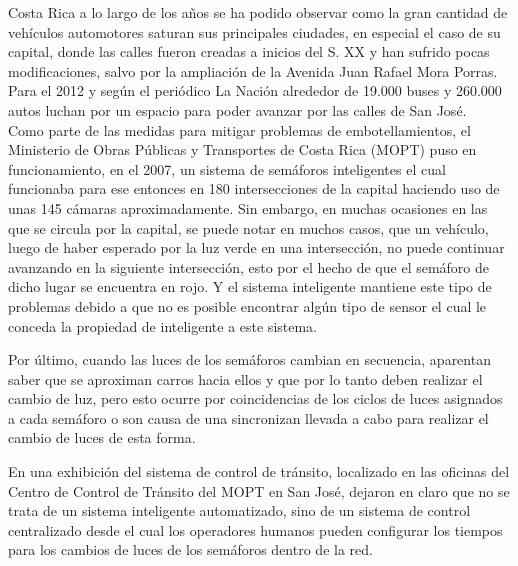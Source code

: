 \documentclass[12pt,journal,compsoc]{IEEEtran}
\begin{document}
% 
% 
% 
% 
 Costa Rica a lo largo de los a\~{n}os se ha podido observar como la gran
	cantidad de veh\'{i}culos automotores saturan sus principales ciudades, en especial
	el caso de su capital, donde las calles fueron creadas a inicios del S. XX y han sufrido pocas modificaciones, salvo por la ampliación de la Avenida Juan Rafael Mora Porras. Para el 2012 y seg\'{u}n el peri\'{o}dico La Naci\'{o}n
	alrededor de 19.000 buses y 260.000 autos luchan por un espacio para poder avanzar por las calles de San Jos\'{e}. \cite{Villegas2012}\\ 
	
Como parte de las medidas para mitigar problemas de embotellamientos, el
	Ministerio de Obras P\'{u}blicas y Transportes de Costa Rica (MOPT) puso en funcionamiento,
	en el 2007, un sistema de sem\'{a}foros inteligentes el cual funcionaba para
	ese entonces en 180 intersecciones de la capital haciendo uso de unas 145
	c\'{a}maras aproximadamente. Sin embargo, en muchas ocasiones en las que se
	circula por la capital, se puede notar en muchos
	casos, que un veh\'{i}culo, luego de haber esperado por la luz verde en una intersección,  no puede continuar  avanzando en la siguiente intersección, esto por el hecho
	de que el sem\'{a}foro de dicho lugar se encuentra en rojo. Y el sistema inteligente mantiene este tipo de
	problemas debido a que no es
	posible encontrar alg\'{u}n tipo de sensor el cual le conceda la propiedad de inteligente a este sistema.\cite{Loaiza2007}
		
		Por \'{u}ltimo, cuando las luces de los sem\'{a}foros cambian en secuencia, aparentan
	saber que se aproximan carros hacia ellos y que por lo tanto deben realizar el
	cambio de luz, pero esto ocurre por coincidencias de los ciclos de luces
	asignados a cada sem\'{a}foro o son causa de una sincronizan llevada a cabo para realizar el cambio de luces de esta forma.

		En una exhibici\'{o}n del sistema de control de tr\'{a}nsito, localizado en las
	oficinas del Centro de Control de Tr\'{a}nsito del MOPT en San Jos\'{e}, dejaron en claro que no se trata de un sistema inteligente automatizado,
	sino de un sistema de control centralizado desde el cual los operadores humanos pueden configurar los tiempos para los cambios de luces de los
	sem\'{a}foros dentro de la red. 
\end{document}
